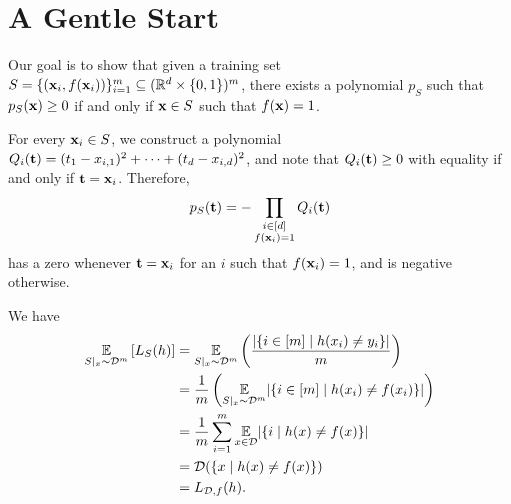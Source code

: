 \chapter{A Gentle Start}

\begin{ex}
  Our goal is to show that given a training set
  $S=\{(\mathbf{x}_i, f(\mathbf{x}_i))\}_{i=1}^m\subseteq (\mathbb{R}^d\times \{0, 1\})^m$,
  there exists a polynomial $p_S$ such that $p_S(\mathbf{x})\geq 0$ if and only if
  $\mathbf{x}\in S$ such that $f(\mathbf{x})=1$.

  For every $\mathbf{x}_i\in S$, we construct a polynomial
  $Q_i(\mathbf{t})=(t_1-x_{i,1})^2+\cdots+(t_d-x_{i,d})^2$,
  and note that $Q_i(\mathbf{t})\geq 0$ with equality if and only if
  $\mathbf{t}=\mathbf{x}_i$. Therefore,
  \begin{align*}
    p_S(\mathbf{t})=-\prod_{\substack{i \in [d] \\ f(\mathbf{x}_i) = 1}}Q_i(\mathbf{t})
  \end{align*}
  has a zero whenever $\mathbf{t}=\mathbf{x}_i$ for an $i$ such that $f(\mathbf{x}_i)=1$, and is
  negative otherwise.
\end{ex}

\begin{ex}
  We have
  \begin{align*}
    \underset{S|_x \sim \mathcal{D}^m}{\mathbb{E}}\left[L_S(h)\right]
     & = \underset{S|_x \sim \mathcal{D}^m}{\mathbb{E}}\left(\frac{|\{i\in[m] \mid h(x_i)\neq y_i\}|}{m}\right)     \\
     & = \frac{1}{m}\left(\underset{S|_x \sim \mathcal{D}^m}{\mathbb{E}}|\{i\in[m] \mid h(x_i)\neq f(x_i)\}|\right) \\
     & = \frac{1}{m}\sum_{i=1}^m\underset{x\in \mathcal{D}}{\mathbb{E}}|\{i \mid h(x)\neq f(x)\}|                   \\
     & = \mathcal{D}(\{x \mid h(x)\neq f(x) \})                                                             \\
     & = L_{\mathcal{D}, f}(h).
  \end{align*}
\end{ex}

\begin{ex}
\end{ex}